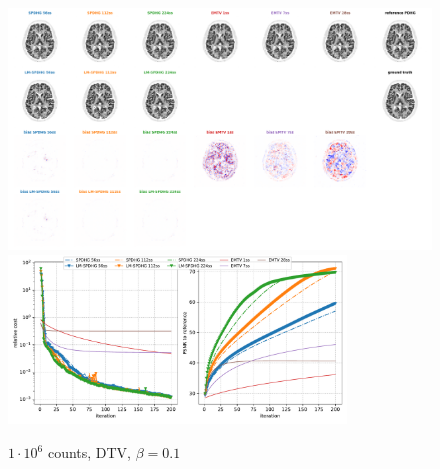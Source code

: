 \begin{figure}
  \centering
    \includegraphics[width=1.0\textwidth]{./figs/brain2d_counts_1.0E+06_seed_1_beta_1.0E-01_prior_DTV_niter_ref_20000_fwhm_4.5_4.5_niter_200.png}
    \includegraphics[width=0.8\textwidth]{./figs/brain2d_counts_1.0E+06_seed_1_beta_1.0E-01_prior_DTV_niter_ref_20000_fwhm_4.5_4.5_niter_200_metrics.pdf}
  \caption{$1\cdot10^6$ counts, DTV, $\beta = 0.1$}
  \label{fig:metrics}
\end{figure}
